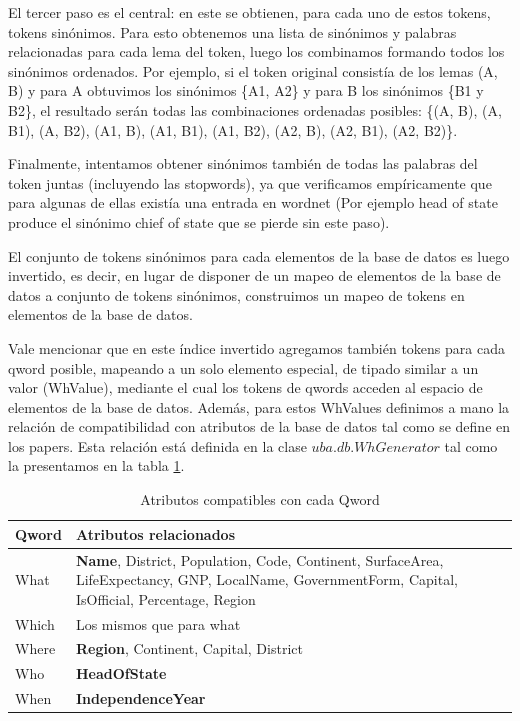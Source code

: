 El tercer paso es el central: en este se obtienen, para cada uno de estos tokens, tokens sinónimos. Para esto obtenemos una lista de sinónimos y palabras relacionadas para cada lema del token, luego los combinamos formando todos los sinónimos ordenados. Por ejemplo, si el token original consistía de los lemas (A, B) y para A obtuvimos los sinónimos \{A1, A2\} y para B los sinónimos \{B1 y B2\}, el resultado serán todas las combinaciones ordenadas posibles: \{(A, B), (A, B1), (A, B2), (A1, B), (A1, B1), (A1, B2), (A2, B), (A2, B1), (A2, B2)\}.

Finalmente, intentamos obtener sinónimos también de todas las palabras del token juntas (incluyendo las stopwords), ya que verificamos empíricamente que para algunas de ellas existía una entrada en wordnet (Por ejemplo head of state produce el sinónimo chief of state que se pierde sin este paso).

El conjunto de tokens sinónimos para cada elementos de la base de datos es luego invertido, es decir, en lugar de disponer de un mapeo de elementos de la base de datos a conjunto de tokens sinónimos, construimos un mapeo de tokens en elementos de la base de datos.

Vale mencionar que en este índice invertido agregamos también tokens para cada qword posible, mapeando a un solo elemento especial, de tipado similar a un valor (WhValue), mediante el cual los tokens de qwords acceden al espacio de elementos de la base de datos. Además, para estos WhValues definimos a mano la relación de compatibilidad con atributos de la base de datos tal como se define en los papers. Esta relación está definida en la clase $uba.db.WhGenerator$ tal como la presentamos en la tabla \ref{table:atributos-qwords}.

\begin{center}
\begin{table}[h]
\centering
\begin{tabular}{| l |  p{12cm} |}
\hline
Qword & Atributos relacionados \\ \hline
What & \textbf{Name}, District, Population, Code, Continent, SurfaceArea, LifeExpectancy, GNP, LocalName, GovernmentForm,
                         Capital, IsOfficial, Percentage, Region \\ \hline
Which & Los mismos que para what\\ \hline
Where & \textbf{Region}, Continent, Capital, District\\ \hline
Who & \textbf{HeadOfState}\\ \hline
When & \textbf{IndependenceYear}\\ \hline
\end{tabular}
\caption{Atributos compatibles con cada Qword}
\label{table:atributos-qwords}
\end{table}
\end{center}

